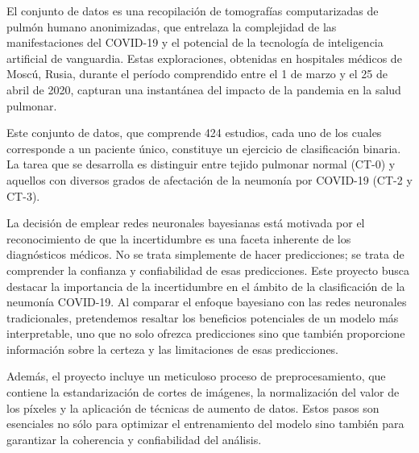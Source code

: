 \documentclass[10pt, oneside, a4paper]{article}
\begin{document}
	El conjunto de datos es una recopilación de tomografías computarizadas de pulmón humano anonimizadas, que entrelaza la complejidad de las manifestaciones del COVID-19 y el potencial de la tecnología de inteligencia artificial de vanguardia. Estas exploraciones, obtenidas en hospitales médicos de Moscú, Rusia, durante el período comprendido entre el 1 de marzo y el 25 de abril de 2020, capturan una instantánea del impacto de la pandemia en la salud pulmonar. 
	
	Este conjunto de datos, que comprende 424 estudios, cada uno de los cuales corresponde a un paciente único, constituye un ejercicio de clasificación binaria. La tarea que se desarrolla es distinguir entre tejido pulmonar normal (CT-0) y aquellos con diversos grados de afectación de la neumonía por COVID-19 (CT-2 y CT-3). 
	
	La decisión de emplear redes neuronales bayesianas está motivada por el reconocimiento de que la incertidumbre es una faceta inherente de los diagnósticos médicos. No se trata simplemente de hacer predicciones; se trata de comprender la confianza y confiabilidad de esas predicciones. Este proyecto busca destacar la importancia de la incertidumbre en el ámbito de la clasificación de la neumonía COVID-19. Al comparar el enfoque bayesiano con las redes neuronales tradicionales, pretendemos resaltar los beneficios potenciales de un modelo más interpretable, uno que no solo ofrezca predicciones sino que también proporcione información sobre la certeza y las limitaciones de esas predicciones.
	
	
	Además, el proyecto incluye un meticuloso proceso de preprocesamiento, que contiene la estandarización de cortes de imágenes, la normalización del valor de los píxeles y la aplicación de técnicas de aumento de datos. Estos pasos son esenciales no sólo para optimizar el entrenamiento del modelo sino también para garantizar la coherencia y confiabilidad del análisis.
	
\end{document}
